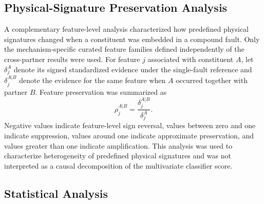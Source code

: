 \subsection{Physical-Signature Preservation Analysis}
\label{sec:preservation}

A complementary feature-level analysis characterized how predefined
physical signatures changed when a constituent was embedded in a compound
fault. Only the mechanism-specific curated feature families defined
independently of the cross-partner results were used. For feature $j$
associated with constituent $A$, let $\delta_j^{A}$ denote its signed
standardized evidence under the single-fault reference and
$\delta_j^{A|B}$ denote the evidence for the same feature when $A$ occurred
together with partner $B$. Feature preservation was summarized as
\begin{equation}
\rho_j^{A|B} = \frac{\delta_j^{A|B}}{\delta_j^{A}}.
\label{eq:preservation}
\end{equation}
Negative values indicate feature-level sign reversal, values between zero
and one indicate suppression, values around one indicate approximate
preservation, and values greater than one indicate amplification. This
analysis was used to characterize heterogeneity of predefined physical
signatures and was not interpreted as a causal decomposition of the
multivariate classifier score.

\subsection{Statistical Analysis}
\label{sec:stats}

